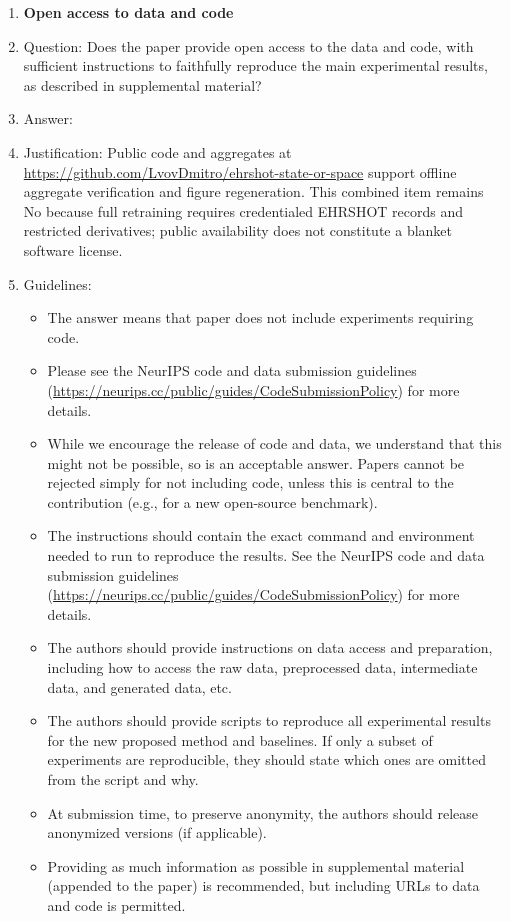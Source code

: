 \documentclass{article}
\begin{document}
\begin{enumerate}
\item {\bf Open access to data and code}
    \item[] Question: Does the paper provide open access to the data and code, with sufficient instructions to faithfully reproduce the main experimental results, as described in supplemental material?
    \item[] Answer: \answerNo{}
    \item[] Justification: Public code and aggregates at \url{https://github.com/LvovDmitro/ehrshot-state-or-space} support offline aggregate verification and figure regeneration. This combined item remains No because full retraining requires credentialed EHRSHOT records and restricted derivatives; public availability does not constitute a blanket software license.
    \item[] Guidelines:
    \begin{itemize}
        \item The answer \answerNA{} means that paper does not include experiments requiring code.
        \item Please see the NeurIPS code and data submission guidelines (\url{https://neurips.cc/public/guides/CodeSubmissionPolicy}) for more details.
        \item While we encourage the release of code and data, we understand that this might not be possible, so \answerNo{} is an acceptable answer. Papers cannot be rejected simply for not including code, unless this is central to the contribution (e.g., for a new open-source benchmark).
        \item The instructions should contain the exact command and environment needed to run to reproduce the results. See the NeurIPS code and data submission guidelines (\url{https://neurips.cc/public/guides/CodeSubmissionPolicy}) for more details.
        \item The authors should provide instructions on data access and preparation, including how to access the raw data, preprocessed data, intermediate data, and generated data, etc.
        \item The authors should provide scripts to reproduce all experimental results for the new proposed method and baselines. If only a subset of experiments are reproducible, they should state which ones are omitted from the script and why.
        \item At submission time, to preserve anonymity, the authors should release anonymized versions (if applicable).
        \item Providing as much information as possible in supplemental material (appended to the paper) is recommended, but including URLs to data and code is permitted.
    \end{itemize}



\end{enumerate}
\end{document}
